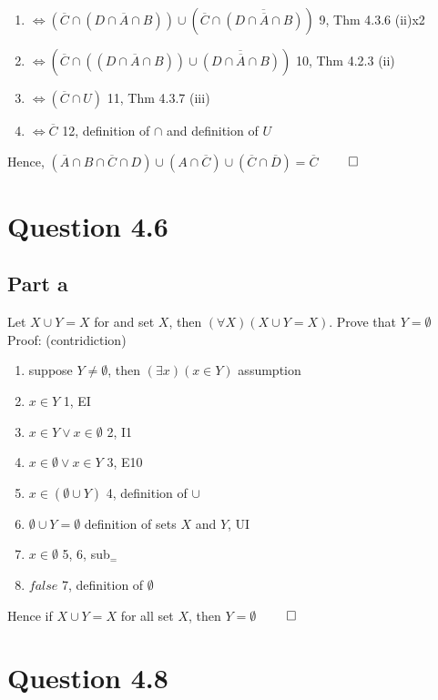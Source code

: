 \documentclass{article}
\begin{document}
\begin{enumerate}
				\item $\Leftrightarrow (\overline{C} \cap (D \cap \overline{A} \cap B)) \cup (\overline{C} \cap \overline{(D \cap \overline{A} \cap B)})$ \hfill 9, Thm 4.3.6 (ii)x2
				\item $\Leftrightarrow (\overline{C} \cap ((D \cap \overline{A} \cap B)) \cup \overline{(D \cap \overline{A} \cap B)})$ \hfill 10, Thm 4.2.3 (ii)
				\item $\Leftrightarrow (\overline{C} \cap U)$ \hfill 11, Thm 4.3.7 (iii)
				\item $\Leftrightarrow \overline{C}$ \hfill 12, definition of $\cap$ and definition of $U$
			\end{enumerate}
			Hence, $(\overline{A} \cap B \cap \overline{C} \cap D) \cup (A \cap \overline{C}) \cup (\overline{C} \cap \overline{D}) = \overline{C}$ \hfill $\qed$
	\section{Question 4.6}
		\subsection{Part a}
			Let $X \cup Y = X$ for and set $X$, then $(\forall X)(X \cup Y = X)$. Prove that $Y = \emptyset$ \\
			Proof: (contridiction)
			\begin{enumerate}
				\item suppose $Y \neq \emptyset$, then $(\exists x)(x \in Y)$ \hfill assumption
				\item $x \in Y$ \hfill 1, EI
				\item $x \in Y \lor x \in \emptyset$ \hfill 2, I1
				\item $x \in \emptyset \lor x \in Y$ \hfill 3, E10
				\item $x \in (\emptyset \cup Y)$ \hfill 4, definition of $\cup$
				\item $\emptyset \cup Y = \emptyset$ \hfill definition of sets $X$ and $Y$, UI
				\item $x \in \emptyset$ \hfill 5, 6, sub$_{=}$
				\item $false$ \hfill 7, definition of $\emptyset$
			\end{enumerate}
			Hence if $X \cup Y = X$ for all set $X$, then $Y = \emptyset$ \hfill $\qed$
	\section{Question 4.8}
\end{document}
